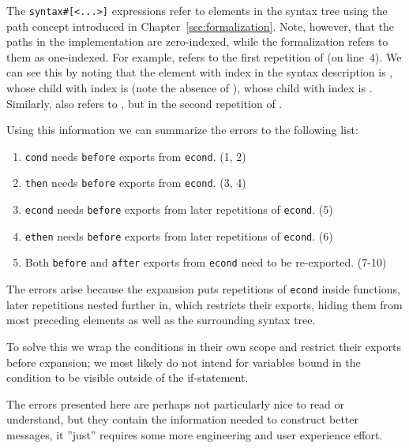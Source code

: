 \documentclass{kththesis}
\begin{document}
The \texttt{syntax#[<...>]} expressions refer to elements in the syntax tree using the path concept introduced in Chapter~\ref{sec:formalization}. Note, however, that the paths in the implementation are zero-indexed, while the formalization refers to them as one-indexed. For example,  refers to the first repetition of  (on line~4). We can see this by noting that the element with index  in the syntax description is , whose child with index  is  (note the absence of \syncon{*}), whose child with index  is . Similarly,  also refers to , but in the second repetition of .

Using this information we can summarize the errors to the following list:

\begin{enumerate}
  \item \texttt{cond} needs \texttt{before} exports from \texttt{econd}. (1, 2)
  \item \texttt{then} needs \texttt{before} exports from \texttt{econd}. (3, 4)
  \item \texttt{econd} needs \texttt{before} exports from later repetitions of \texttt{econd}. (5)
  \item \texttt{ethen} needs \texttt{before} exports from later repetitions of \texttt{econd}. (6)
  \item Both \texttt{before} and \texttt{after} exports from \texttt{econd} need to be re-exported. (7-10)
\end{enumerate}

The errors arise because the expansion puts repetitions of \texttt{econd} inside functions, later repetitions nested further in, which restricts their exports, hiding them from most preceding elements as well as the surrounding syntax tree.

To solve this we wrap the conditions in their own scope and restrict their exports before expansion; we most likely do not intend for variables bound in the condition to be visible outside of the if-statement.

The errors presented here are perhaps not particularly nice to read or understand, but they contain the information needed to construct better messages, it ''just'' requires some more engineering and user experience effort.
\end{document}
